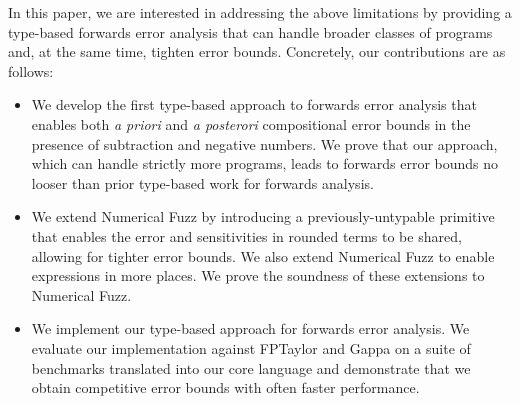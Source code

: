 In this paper, we are interested in addressing the above limitations by
providing a type-based forwards error analysis that can handle broader classes
of programs and, at the same time, tighten error bounds. 
Concretely, our contributions are as follows:
\begin{itemize}
  \item We develop the first type-based approach to forwards error analysis that
    enables both \textit{a priori} and \textit{a posterori} compositional error
    bounds in the presence of subtraction and negative numbers. We prove that
    our approach, which can handle strictly more programs, leads to forwards
    error bounds no looser than prior type-based work for forwards analysis.

  \item We extend Numerical Fuzz by introducing a previously-untypable primitive
    that enables the error and sensitivities in rounded terms to be shared,
    allowing for tighter error bounds. We also extend Numerical Fuzz to enable
    expressions in more places. We prove the soundness of these extensions to
    Numerical Fuzz.

  \item We implement our type-based approach for forwards error analysis. We
    evaluate our implementation against FPTaylor and Gappa on a suite of
    benchmarks translated into our core language and demonstrate that we obtain
    competitive error bounds with often faster performance.
\end{itemize}
